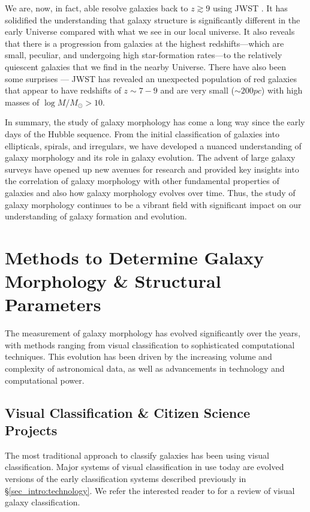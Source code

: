 We are, now, in fact, able resolve galaxies back to $z \gtrsim 9$ using JWST \citep[e.g.,][]{labbe_23,finkelstein_23, kartaltepe_23}. It has solidified the understanding that galaxy structure is significantly different in the early Universe compared with what we see in our local universe. It also reveals that there is a progression from galaxies at the highest redshifts—which are small, peculiar, and undergoing high star-formation rates—to the relatively quiescent galaxies that we find in the nearby Universe. There have also been some surprises --- JWST has revealed an unexpected population of red galaxies that appear to have redshifts of $z \sim 7 − 9$ and are very small ($\sim 200 pc$) with high masses of $\log M/M_{\odot} > 10$.

In summary, the study of galaxy morphology has come a long way since the early days of the Hubble sequence. From the initial classification of galaxies into ellipticals, spirals, and irregulars, we have developed a nuanced understanding of galaxy morphology and its role in galaxy evolution. The advent of large galaxy surveys have opened up new avenues for research and provided key insights into the correlation of galaxy morphology with other fundamental properties of galaxies and also how galaxy morphology evolves over time. Thus, the study of galaxy morphology continues to be a vibrant field with significant impact on our understanding of galaxy formation and evolution. 


\section{Methods to Determine Galaxy Morphology \& Structural Parameters} \label{sec_intro:determining_morph}

The measurement of galaxy morphology has evolved significantly over the years, with methods ranging from visual classification to sophisticated computational techniques. This evolution has been driven by the increasing volume and complexity of astronomical data, as well as advancements in technology and computational power.

\subsection{Visual Classification \& Citizen Science Projects} \label{sec_intro:trad_morph}

The most traditional approach to classify galaxies has been using visual classification. Major systems of visual classification in use today are evolved versions of the early classification systems described previously in \S \ref{sec_intro:technology}. We refer the interested reader to \citet{buta_13} for a review of visual galaxy classification. 

